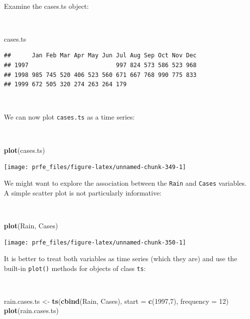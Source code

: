 \documentclass[12pt,a4paper]{book}
\newenvironment{Shaded}{\begin{snugshade}}{\end{snugshade}}
\newcommand{\DataTypeTok}[1]{\textcolor[rgb]{0.13,0.29,0.53}{#1}}
\newcommand{\DecValTok}[1]{\textcolor[rgb]{0.00,0.00,0.81}{#1}}
\newcommand{\KeywordTok}[1]{\textcolor[rgb]{0.13,0.29,0.53}{\textbf{#1}}}
\newcommand{\NormalTok}[1]{#1}
\newcommand{\StringTok}[1]{\textcolor[rgb]{0.31,0.60,0.02}{#1}}
\theoremstyle{definition}
\theoremstyle{definition}
\theoremstyle{definition}
\theoremstyle{remark}
\begin{document}
~

Examine the cases.ts object:

~

\begin{Shaded}
\begin{Highlighting}[]
\NormalTok{cases.ts}
\end{Highlighting}
\end{Shaded}

\begin{verbatim}
##      Jan Feb Mar Apr May Jun Jul Aug Sep Oct Nov Dec
## 1997                         997 824 573 586 523 968
## 1998 985 745 520 406 523 560 671 667 768 990 775 833
## 1999 672 505 320 274 263 264 179
\end{verbatim}

~

We can now plot \texttt{cases.ts} as a time series:

~

\begin{Shaded}
\begin{Highlighting}[]
\KeywordTok{plot}\NormalTok{(cases.ts)}
\end{Highlighting}
\end{Shaded}

\begin{center}\texttt{[image: prfe\_files/figure-latex/unnamed-chunk-349-1]} \end{center}

\newpage

We might want to explore the association between the \texttt{Rain} and
\texttt{Cases} variables. A simple scatter plot is not particularly
informative:

~

\begin{Shaded}
\begin{Highlighting}[]
\KeywordTok{plot}\NormalTok{(Rain, Cases)}
\end{Highlighting}
\end{Shaded}

\begin{center}\texttt{[image: prfe\_files/figure-latex/unnamed-chunk-350-1]} \end{center}

\newpage

It is better to treat both variables as time series (which they are) and
use the built-in \texttt{plot()} methods for objects of class
\texttt{ts}:

~

\begin{Shaded}
\begin{Highlighting}[]
\NormalTok{rain.cases.ts <-}\StringTok{ }\KeywordTok{ts}\NormalTok{(}\KeywordTok{cbind}\NormalTok{(Rain, Cases), }\DataTypeTok{start =} \KeywordTok{c}\NormalTok{(}\DecValTok{1997}\NormalTok{,}\DecValTok{7}\NormalTok{), }\DataTypeTok{frequency =} \DecValTok{12}\NormalTok{)}
\KeywordTok{plot}\NormalTok{(rain.cases.ts)}
\end{Highlighting}
\end{Shaded}
\end{document}

